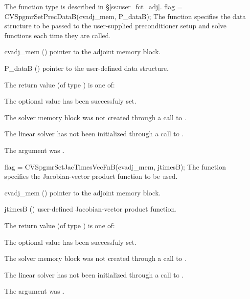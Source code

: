 {
   The function type  is described in \S\ref{ss:user_fct_adj}.
}
{
  flag = CVSpgmrSetPrecDataB(cvadj\_mem, P\_dataB);
}
{
  The function  specifies the data structure
  to be passed to the user-supplied preconditioner setup and solve
  functions each time they are called.
}
{
  \begin{args}
  \item[cvadj\_mem] ()
    pointer to the adjoint memory block.
  \item[P\_dataB] ()
     pointer to the user-defined data structure.
  \end{args}
}
{
  The return value  (of type ) is one of:
  \begin{args}
  \item[\Id{CVSPGMR\_SUCCESS}] 
    The optional value has been successfuly set.
  \item[\Id{CVSPGMR\_MEM\_NULL}]
    The {\cvodes} solver memory block was not created through a call to .
  \item[\Id{CVSPGMR\_LMEM\_NULL}]
    The {\cvspgmr} linear solver has not been initialized through a call to .
  \item[\Id{CV\_ADJMEM\_NULL}]
    The  argument was .
  \end{args}
}
{}
{
  flag = CVSpgmrSetJacTimesVecFnB(cvadj\_mem, jtimesB);
}
{
  The function  specifies the Jacobian-vector 
  product function to be used.
}
{
  \begin{args}
  \item[cvadj\_mem] ()
    pointer to the adjoint memory block.
  \item[jtimesB] ()
    user-defined Jacobian-vector product function.
  \end{args}
}
{
  The return value  (of type ) is one of:
  \begin{args}
  \item[\Id{CVSPGMR\_SUCCESS}] 
    The optional value has been successfuly set.
  \item[\Id{CVSPGMR\_MEM\_NULL}]
    The {\cvodes} solver memory block was not created through a call to .
  \item[\Id{CVSPGMR\_LMEM\_NULL}]
    The {\cvspgmr} linear solver has not been initialized through a call to .
  \item[\Id{CV\_ADJMEM\_NULL}]
    The  argument was .
  \end{args}
}
